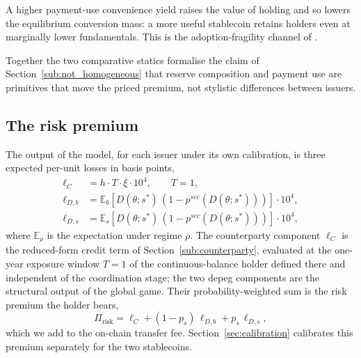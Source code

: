 A higher payment-use convenience yield raises the value of holding and so lowers the equilibrium conversion mass: a more useful stablecoin retains holders even at marginally lower fundamentals. This is the adoption-fragility channel of \citet{bertsch_2025_adoption_fragility}.

Together the two comparative statics formalise the claim of Section~\ref{sub:not_homogeneous} that reserve composition and payment use are primitives that move the priced premium, not stylistic differences between issuers.

\subsection{The risk premium}\label{sub:what_it_delivers}

The output of the model, for each issuer under its own calibration, is three expected per-unit losses in basis points,
\begin{align}
\ell_C &= h \cdot T \cdot \xi \cdot 10^4, \qquad T = 1,\label{eq:ellC} \\
\ell_{D,b} &= \mathbb{E}_b\!\left[D(\theta; s^*)\,(1 - p^{sec}(D(\theta; s^*)))\right] \cdot 10^4,\label{eq:ellDb} \\
\ell_{D,s} &= \mathbb{E}_s\!\left[D(\theta; s^*)\,(1 - p^{sec}(D(\theta; s^*)))\right] \cdot 10^4,\label{eq:ellDs}
\end{align}
where $\mathbb{E}_\rho$ is the expectation under regime $\rho$. The counterparty component $\ell_C$ is the reduced-form credit term of Section~\ref{sub:counterparty}, evaluated at the one-year exposure window $T=1$ of the continuous-balance holder defined there and independent of the coordination stage; the two depeg components are the structural output of the global game. Their probability-weighted sum is the risk premium the holder bears,
\begin{equation}\label{eq:total_risk_premium}
\Pi_{\text{risk}} = \ell_C + (1-p_s)\,\ell_{D,b} + p_s\,\ell_{D,s},
\end{equation}
which we add to the on-chain transfer fee. Section~\ref{sec:calibration} calibrates this premium separately for the two stablecoins.
